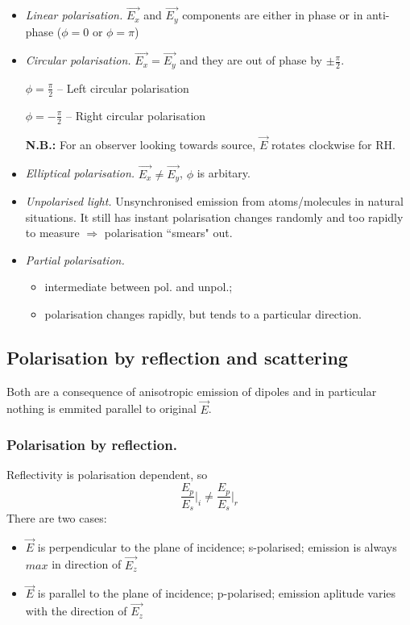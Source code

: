 \documentclass[10pt]{article}
\begin{document}
\begin{itemize}
\item[(i)] \textit{Linear polarisation.} $\vec{E_x}$ and $\vec{E_y}$ components are either in phase or in anti-phase ($\phi = 0$ or $\phi = \pi$)
\item[(ii)] \textit{Circular polarisation.} $\vec{E_x}=\vec{E_y}$ and they are out of phase by $\pm \frac{\pi}{2}$.

$\phi=\frac{\pi}{2}$ -- Left circular polarisation

$\phi=-\frac{\pi}{2}$ -- Right circular polarisation

\textbf{N.B.:} For an observer looking towards source, $\vec{E}$ rotates clockwise for RH.
\item[(iii)] \textit{Elliptical polarisation.} $\vec{E_x} \neq \vec{E_y}$, $\phi$ is arbitary.
\item[(iv)] \textit{Unpolarised light.} Unsynchronised emission from atoms/molecules in natural situations. It still has instant polarisation changes randomly and too rapidly to measure $\Rightarrow$ polarisation “smears" out.
\item[(v)] \textit{Partial polarisation.}
\begin{itemize}
\item[-] intermediate between pol. and unpol.;
\item[-] polarisation changes rapidly, but tends to a particular direction.
\end{itemize}
\end{itemize}

\subsection{Polarisation by reflection and scattering}
Both are a consequence of anisotropic emission of dipoles and in particular nothing is emmited parallel to original $\vec{E}$.

\subsubsection{Polarisation by reflection.}
Reflectivity is polarisation dependent, so
\begin{equation*}
\frac{E_p}{E_s} \vert_i \neq \frac{E_p}{E_s} \vert_r
\end{equation*}
There are two cases:
\begin{itemize}
\item[$\bullet$] $\vec{E}$ is perpendicular to the plane of incidence; s-polarised; emission is always $max$ in direction of $\vec{E_z}$
\item[$\bullet$] $\vec{E}$ is parallel to the plane of incidence; p-polarised; emission aplitude varies with the direction of $\vec{E_z}$
\end{itemize}
\end{document}
